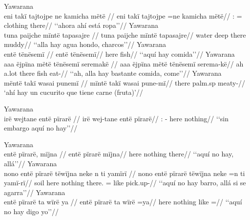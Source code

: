 \documentclass{memoir}
\begin{document}
\pex\label{ex-aff-part-nsubj}    \a Yawarana\\
    \label{convcosnoind-48}        \begingl
        \glpreamble eni takï tajtojpe ne kamicha mëtë //
        \gla eni takï tajtojpe =ne kamicha mëtë//
        \glb {}:   = clothing there//
            \glft ‘‘ahora ahí está ropa’’//  
        \endgl 
    \a Yawarana\\
    \label{histgrme-76}        \begingl
        \glpreamble tuna paijche mïntë tapasajre //
        \gla tuna paijche mïntë tapasajre//
        \glb water deep there muddy//
            \glft ‘‘alla hay agua hondo, charcos’’//  
        \endgl 
    \a Yawarana\\
    \label{histgrme-86}        \begingl
        \glpreamble entë tënësemï //
        \gla entë tënësemï//
        \glb here fish//
            \glft ‘‘aquí hay comida’’//  
        \endgl 
    \a Yawarana\\
    \label{histgrme-89}        \begingl
        \glpreamble aaa ëjpïna mëtë tënësemï seremakë //
        \gla aaa ëjpïna mëtë tënësemï serema-kë//
        \glb ah a.lot there fish eat-//
            \glft ‘‘ah, alla hay bastante comida, come’’//  
        \endgl 
    \a Yawarana\\
    \label{ctorosq-116}        \begingl
        \glpreamble mëntë takï wasai punemï //
        \gla mïntë takï wasai pune-mï//
        \glb there  palm.sp meaty-//
            \glft ‘ahí hay un cucurito que tiene carne (fruta)’//  
        \endgl 
\xe

\ex Yawarana \\
\label{ex-neg-part-pirare-cop-nsubj}    \begingl
    \glpreamble irë wejtane entë pïrarë //
    \gla irë wej-tane entë pïrarë//
    \glb {}: - here nothing//
        \glft ‘‘sin embargo aquí no hay’’//  
    \endgl 
\xe

\pex\label{ex-neg-part-pirare-nsubj}    \a Yawarana\\
    \label{convinsectmaj-18}        \begingl
        \glpreamble entë pïrarë, mïjna //
        \gla entë pïrarë mïjna//
        \glb here nothing there//
            \glft ‘‘aquí no hay, allá’’//  
        \endgl 
    \a Yawarana\\
    \label{histyarirdi-823}        \begingl
        \glpreamble nono entë pïrarë tëwïjna neke n ti yamïrï //
        \gla nono entë pïrarë tëwïjna neke =n ti yamï-rï//
        \glb soil here nothing there.  = like pick.up-//
            \glft ‘‘aquí no hay barro, allá si se agarra’’//  
        \endgl 
    \a Yawarana\\
    \label{histyarirdi-824}        \begingl
        \glpreamble entë pïrarë ta wïrë ya //
        \gla entë pïrarë ta wïrë =ya//
        \glb here nothing like  =//
            \glft ‘‘aquí no hay digo yo’’//  
        \endgl 
\xe
\end{document}
